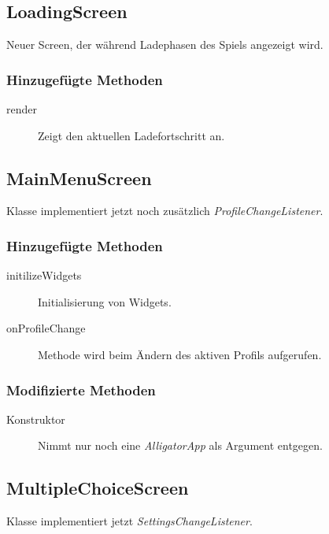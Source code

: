 \subsection{LoadingScreen}
Neuer Screen, der während Ladephasen des Spiels angezeigt wird.

\subsubsection{Hinzugefügte Methoden}
\begin{description}
\item[render]
Zeigt den aktuellen Ladefortschritt an.


\end{description}



\subsection{MainMenuScreen}
Klasse implementiert jetzt noch zusätzlich \emph{ProfileChangeListener}.

\subsubsection{Hinzugefügte Methoden}
\begin{description}
\item[initilizeWidgets]
Initialisierung von Widgets.
\item[onProfileChange]
Methode wird beim Ändern des aktiven Profils aufgerufen.
\end{description}

\subsubsection{Modifizierte Methoden}
\begin{description}
\item[Konstruktor]
Nimmt nur noch eine \emph{AlligatorApp} als Argument entgegen.

\end{description}


\subsection{MultipleChoiceScreen}
Klasse implementiert jetzt \emph{SettingsChangeListener}.


